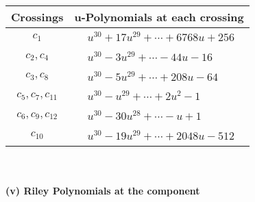 \documentclass[1p]{elsarticle_modified}
\theoremstyle{definition}
\begin{document}
\begin{tabular}{m{50pt}|m{274pt}}
Crossings & \hspace{64pt}u-Polynomials at each crossing \\
\hline $$\begin{aligned}c_{1}\end{aligned}$$&$\begin{aligned}
&u^{30}+17 u^{29}+\cdots+6768 u+256
\end{aligned}$\\
\hline $$\begin{aligned}c_{2},c_{4}\end{aligned}$$&$\begin{aligned}
&u^{30}-3 u^{29}+\cdots-44 u-16
\end{aligned}$\\
\hline $$\begin{aligned}c_{3},c_{8}\end{aligned}$$&$\begin{aligned}
&u^{30}-5 u^{29}+\cdots+208 u-64
\end{aligned}$\\
\hline $$\begin{aligned}c_{5},c_{7},c_{11}\end{aligned}$$&$\begin{aligned}
&u^{30}- u^{29}+\cdots+2 u^2-1
\end{aligned}$\\
\hline $$\begin{aligned}c_{6},c_{9},c_{12}\end{aligned}$$&$\begin{aligned}
&u^{30}-30 u^{28}+\cdots- u+1
\end{aligned}$\\
\hline $$\begin{aligned}c_{10}\end{aligned}$$&$\begin{aligned}
&u^{30}-19 u^{29}+\cdots+2048 u-512
\end{aligned}$\\
\hline
\end{tabular}\\~\\
\newpage\renewcommand{\arraystretch}{1}
\flushleft \textbf{(v) Riley Polynomials at the component}\newline \\
\end{document}
